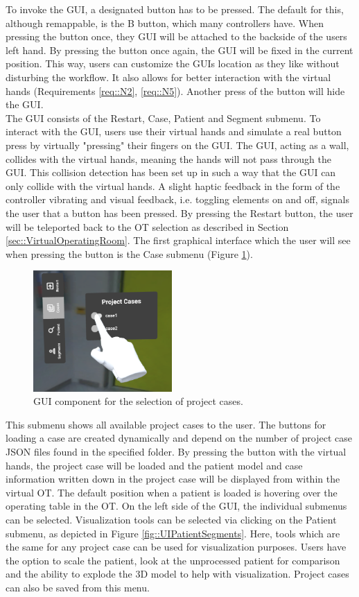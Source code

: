 To invoke the GUI, a designated button has to be pressed.
The default for this, although remappable, is the B button, which many controllers have.
When pressing the button once, they GUI will be attached to the backside of the users left hand.
By pressing the button once again, the GUI will be fixed in the current position.
This way, users can customize the GUIs location as they like without disturbing the workflow.
It also allows for better interaction with the virtual hands (Requirements \ref{req::N2}, \ref{req::N5}).
Another press of the button will hide the GUI.
\\ The GUI consists of the Restart, Case, Patient and Segment submenu.
To interact with the GUI, users use their virtual hands and simulate a real button press by virtually "pressing" their fingers on the GUI.
The GUI, acting as a wall, collides with the virtual hands, meaning the hands will not pass through the GUI.
This collision detection has been set up in such a way that the GUI can only collide with the virtual hands.
A slight haptic feedback in the form of the controller vibrating and visual feedback, i.e. toggling elements on and off, signals the user that a button has been pressed.
By pressing the Restart button, the user will be teleported back to the OT selection as described in Section \ref{sec::VirtualOperatingRoom}.
The first graphical interface which the user will see when pressing the button is the Case submenu (Figure \ref{fig::UIProjectCase}).
\begin{figure}[ht]
    \centering
    \includegraphics[width=200px]{images/implementation/user_interface/project_cases.png}
    \caption{\label{fig::UIProjectCase}GUI component for the selection of project cases.}
\end{figure}

This submenu shows all available project cases to the user.
The buttons for loading a case are created dynamically and depend on the number of project case JSON files found in the specified folder.
By pressing the button with the virtual hands, the project case will be loaded and the patient model and case information 
written down in the project case will be displayed from within the virtual OT.
The default position when a patient is loaded is hovering over the operating table in the OT.
On the left side of the GUI, the individual submenus can be selected.
Visualization tools can be selected via clicking on the Patient submenu, as depicted in Figure \ref{fig::UIPatientSegments}.
Here, tools which are the same for any project case can be used for visualization purposes.
Users have the option to scale the patient, look at the unprocessed patient for comparison and the ability to explode the 3D model to help with visualization.
Project cases can also be saved from this menu.

